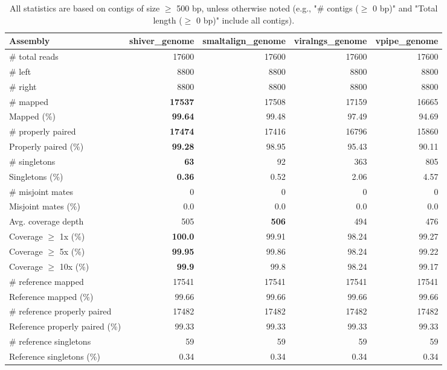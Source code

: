\documentclass[12pt,a4paper]{article}
\begin{document}
\begin{table}[ht]
\begin{center}
\caption{All statistics are based on contigs of size $\geq$ 500 bp, unless otherwise noted (e.g., "\# contigs ($\geq$ 0 bp)" and "Total length ($\geq$ 0 bp)" include all contigs).}
\begin{tabular}{|l*{4}{|r}|}
\hline
Assembly & shiver\_genome & smaltalign\_genome & viralngs\_genome & vpipe\_genome \\ \hline
\# total reads & 17600 & 17600 & 17600 & 17600 \\ \hline
\# left & 8800 & 8800 & 8800 & 8800 \\ \hline
\# right & 8800 & 8800 & 8800 & 8800 \\ \hline
\# mapped & {\bf 17537} & 17508 & 17159 & 16665 \\ \hline
Mapped (\%) & {\bf 99.64} & 99.48 & 97.49 & 94.69 \\ \hline
\# properly paired & {\bf 17474} & 17416 & 16796 & 15860 \\ \hline
Properly paired (\%) & {\bf 99.28} & 98.95 & 95.43 & 90.11 \\ \hline
\# singletons & {\bf 63} & 92 & 363 & 805 \\ \hline
Singletons (\%) & {\bf 0.36} & 0.52 & 2.06 & 4.57 \\ \hline
\# misjoint mates & 0 & 0 & 0 & 0 \\ \hline
Misjoint mates (\%) & 0.0 & 0.0 & 0.0 & 0.0 \\ \hline
Avg. coverage depth & 505 & {\bf 506} & 494 & 476 \\ \hline
Coverage $\geq$ 1x (\%) & {\bf 100.0} & 99.91 & 98.24 & 99.27 \\ \hline
Coverage $\geq$ 5x (\%) & {\bf 99.95} & 99.86 & 98.24 & 99.22 \\ \hline
Coverage $\geq$ 10x (\%) & {\bf 99.9} & 99.8 & 98.24 & 99.17 \\ \hline
\# reference mapped & 17541 & 17541 & 17541 & 17541 \\ \hline
Reference mapped (\%) & 99.66 & 99.66 & 99.66 & 99.66 \\ \hline
\# reference properly paired & 17482 & 17482 & 17482 & 17482 \\ \hline
Reference properly paired (\%) & 99.33 & 99.33 & 99.33 & 99.33 \\ \hline
\# reference singletons & 59 & 59 & 59 & 59 \\ \hline
Reference singletons (\%) & 0.34 & 0.34 & 0.34 & 0.34 \\ \hline

\end{tabular}
\end{center}
\end{table}
\end{document}

